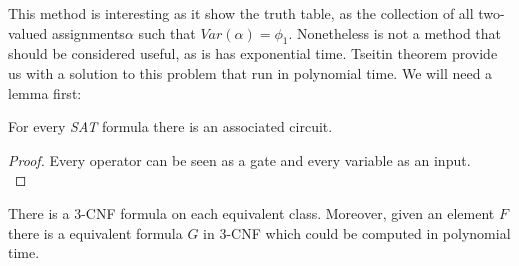   This method is interesting as it show the truth table, as the collection of all two-valued assignments$\alpha$ such that $Var(\alpha) = \phi_1$. Nonetheless is not a method that should be considered useful, as is has exponential time. Tseitin theorem provide us with a solution to this problem that run in polynomial time. We will need a lemma first:

  \begin{lemma}
    For every \emph{SAT} formula there is an associated circuit.
  \end{lemma}
  \begin{proof}
    Every operator can be seen as a gate and every variable as an input.\\
  \end{proof}
  
  \begin{theorem} \label{the:Tseitin}
    There is a 3-CNF formula on each equivalent class. Moreover, given an element $F$  there is a equivalent formula $G$  in 3-CNF which could be computed in polynomial time. 
  \end{theorem}

